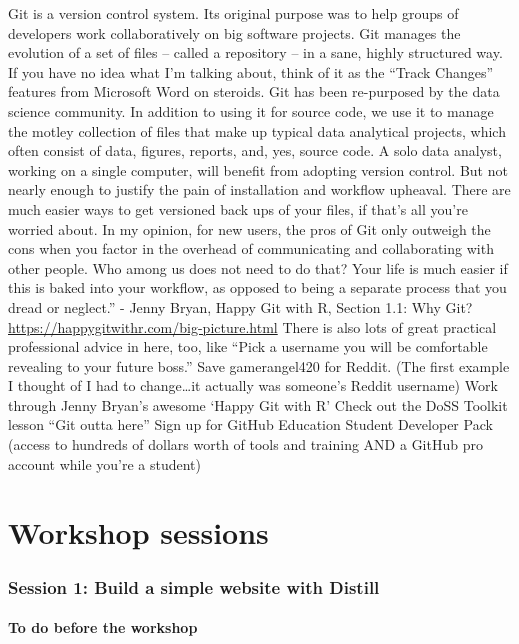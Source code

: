 \documentclass[
]{article}
\begin{document}
Git is a version control system. Its original purpose was to help groups of developers work collaboratively on big software projects. Git manages the evolution of a set of files -- called a repository -- in a sane, highly structured way. If you have no idea what I'm talking about, think of it as the ``Track Changes'' features from Microsoft Word on steroids.
Git has been re-purposed by the data science community. In addition to using it for source code, we use it to manage the motley collection of files that make up typical data analytical projects, which often consist of data, figures, reports, and, yes, source code.
A solo data analyst, working on a single computer, will benefit from adopting version control. But not nearly enough to justify the pain of installation and workflow upheaval. There are much easier ways to get versioned back ups of your files, if that's all you're worried about.
In my opinion, for new users, the pros of Git only outweigh the cons when you factor in the overhead of communicating and collaborating with other people. Who among us does not need to do that? Your life is much easier if this is baked into your workflow, as opposed to being a separate process that you dread or neglect.'' - Jenny Bryan, Happy Git with R, Section 1.1: Why Git? \url{https://happygitwithr.com/big-picture.html}
There is also lots of great practical professional advice in here, too, like ``Pick a username you will be comfortable revealing to your future boss.'' Save gamerangel420 for Reddit. (The first example I thought of I had to change\ldots it actually was someone's Reddit username)
Work through Jenny Bryan's awesome `Happy Git with R'
Check out the DoSS Toolkit lesson ``Git outta here''
Sign up for GitHub Education Student Developer Pack (access to hundreds of dollars worth of tools and training AND a GitHub pro account while you're a student)

\hypertarget{part-workshop-sessions}{%
\part{Workshop sessions}\label{part-workshop-sessions}}

\hypertarget{session-1-build-a-simple-website-with-distill}{%
\section{Session 1: Build a simple website with Distill}\label{session-1-build-a-simple-website-with-distill}}

\hypertarget{s1pre}{%
\subsection{To do before the workshop}\label{s1pre}}
\end{document}
